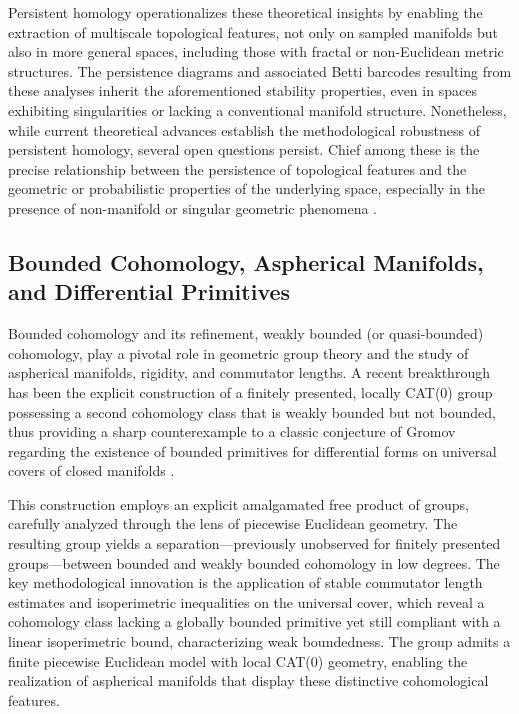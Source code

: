 Persistent homology operationalizes these theoretical insights by enabling the extraction of multiscale topological features, not only on sampled manifolds but also in more general spaces, including those with fractal or non-Euclidean metric structures. The persistence diagrams and associated Betti barcodes resulting from these analyses inherit the aforementioned stability properties, even in spaces exhibiting singularities or lacking a conventional manifold structure. Nonetheless, while current theoretical advances establish the methodological robustness of persistent homology, several open questions persist. Chief among these is the precise relationship between the persistence of topological features and the geometric or probabilistic properties of the underlying space, especially in the presence of non-manifold or singular geometric phenomena \cite{ref88}.

\subsection{Bounded Cohomology, Aspherical Manifolds, and Differential Primitives}

Bounded cohomology and its refinement, weakly bounded (or quasi-bounded) cohomology, play a pivotal role in geometric group theory and the study of aspherical manifolds, rigidity, and commutator lengths. A recent breakthrough has been the explicit construction of a finitely presented, locally CAT(0) group possessing a second cohomology class that is weakly bounded but not bounded, thus providing a sharp counterexample to a classic conjecture of Gromov regarding the existence of bounded primitives for differential forms on universal covers of closed manifolds \cite{ref84}.

This construction employs an explicit amalgamated free product of groups, carefully analyzed through the lens of piecewise Euclidean geometry. The resulting group yields a separation—previously unobserved for finitely presented groups—between bounded and weakly bounded cohomology in low degrees. The key methodological innovation is the application of stable commutator length estimates and isoperimetric inequalities on the universal cover, which reveal a cohomology class lacking a globally bounded primitive yet still compliant with a linear isoperimetric bound, characterizing weak boundedness. The group admits a finite piecewise Euclidean model with local CAT(0) geometry, enabling the realization of aspherical manifolds that display these distinctive cohomological features.

